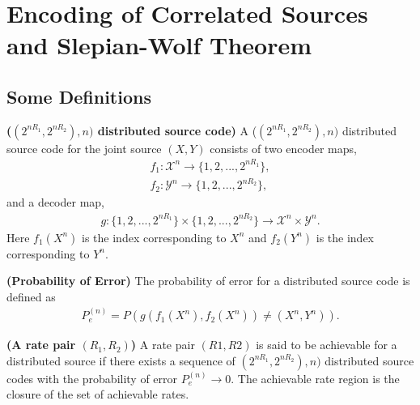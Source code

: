 \section{Encoding of Correlated Sources and Slepian-Wolf Theorem}
\subsection{Some Definitions}
%
\begin{tcolorbox}[boxrule=0pt,frame hidden,sharp corners,enhanced, opacityback=0, borderline west={2pt}{0pt}{red}]
\begin{defn} \textbf{($(2^{nR_1}, 2^{nR_2}),n)$ distributed source code)} A ($(2^{nR_1}, 2^{nR_2}),n)$ distributed source code for the joint source $(X,Y)$ consists of two encoder maps,
%
\begin{eqnarray}
f_1 : \mathcal{X}^n \rightarrow \{1,2,...,2^{nR_1}\}, \\
f_2 : \mathcal{Y}^n \rightarrow \{1,2,...,2^{nR_2}\},
\end{eqnarray}
%
and a decoder map,
%
\begin{eqnarray}
 g : \{1,2,...,2^{nR_1}\} \times \{1,2,...,2^{nR_2}\} \rightarrow  \mathcal{X}^n \times \mathcal{Y}^n.
\end{eqnarray}
%
Here $f_1(X^n)$ is the index corresponding to $X^n$ and $f_2(Y^n)$ is the index corresponding to $Y^n$. 
\end{defn}
\end{tcolorbox}
%
\begin{tcolorbox}[boxrule=0pt,frame hidden,sharp corners,enhanced, opacityback=0, borderline west={2pt}{0pt}{red}]
\begin{defn} \textbf{(Probability of Error)} The probability of error for a distributed source code is defined as
%
\begin{eqnarray}
    P_e^{(n)} = P(g(f_1(X^n), f_2(X^n)) \neq (X^n, Y^n)).
\end{eqnarray}
%
\end{defn}
\end{tcolorbox}
%
\begin{tcolorbox}[boxrule=0pt,frame hidden,sharp corners,enhanced, opacityback=0, borderline west={2pt}{0pt}{red}]
\begin{defn} \textbf{(A rate pair $(R_1, R_2)$)} A rate pair $(R1, R2)$ is said to be achievable for a distributed
source if there exists a sequence of $(2^{nR_1}, 2^{nR_2}),n)$ distributed source codes with the probability of error $P_e^{(n)} \rightarrow 0$. The achievable rate region is
the closure of the set of achievable rates.
\end{defn}
\end{tcolorbox}
%
